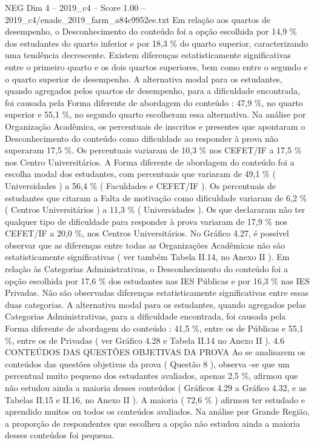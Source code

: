 \begin{textsample}{NEG Dim 4 – 2019\_c4 – Score 1.00 – 2019\_c4/enade\_2019\_farm\_a84c9952ee.txt}
Em relação aos quartos de desempenho, o Desconhecimento do conteúdo foi a opção escolhida por 14,9 \% dos estudantes do quarto inferior e por 18,3 \% do quarto superior, caracterizando uma tendência decrescente.
Existem diferenças estatisticamente significativas entre o primeiro quarto e os dois quartos superiores, bem como entre o segundo e o quarto superior de desempenho.
A alternativa modal para os estudantes, quando agregados pelos quartos de desempenho, para a dificuldade encontrada, foi causada pela Forma diferente de abordagem do conteúdo : 47,9 \%, no quarto superior e 55,1 \%, no segundo quarto escolheram essa alternativa.
Na análise por Organização Acadêmica, os percentuais de inscritos e presentes que apontaram o Desconhecimento do conteúdo como dificuldade ao responder à prova não superaram 17,5 \%.
Os percentuais variaram de 10,3 \% nos CEFET/IF a 17,5 \% nos Centro Universitários.
A Forma diferente de abordagem do conteúdo foi a escolha modal dos estudantes, com percentuais que variaram de 49,1 \% ( Universidades ) a 56,4 \% ( Faculdades e CEFET/IF ).
Os percentuais de estudantes que citaram a Falta de motivação como dificuldade variaram de 6,2 \% ( Centros Universitários ) a 11,3 \% ( Universidades ).
Os que declararam não ter qualquer tipo de dificuldade para responder à prova variaram de 17,9 \% nos CEFET/IF a 20,0 \%, nos Centros Universitários.
No Gráfico 4.27, é possível observar que as diferenças entre todas as Organizações Acadêmicas não são estatisticamente significativas ( ver também Tabela II.14, no Anexo II ).
Em relação às Categorias Administrativas, o Desconhecimento do conteúdo foi a opção escolhida por 17,6 \% dos estudantes nas IES Públicas e por 16,3 \% nas IES Privadas.
Não são observadas diferenças estatisticamente significativas entre essas duas categorias.
A alternativa modal para os estudantes, quando agregados pelas Categorias Administrativas, para a dificuldade encontrada, foi causada pela Forma diferente de abordagem do conteúdo : 41,5 \%, entre os de Públicas e 55,1 \%, entre os de Privadas ( ver Gráfico 4.28 e Tabela II.14 no Anexo II ). 4.6 CONTEÚDOS DAS QUESTÕES OBJETIVAS DA PROVA Ao se analisarem os conteúdos das questões objetivas da prova ( Questão 8 ), observa -se que um percentual muito pequeno dos estudantes avaliados, apenas 2,5 \%, afirmou que não estudou ainda a maioria desses conteúdos ( Gráficos 4.29 a Gráfico 4.32, e as Tabelas II.15 e II.16, no Anexo II ).
A maioria ( 72,6 \% ) afirmou ter estudado e aprendido muitos ou todos os conteúdos avaliados.
Na análise por Grande Região, a proporção de respondentes que escolheu a opção não estudou ainda a maioria desses conteúdos foi pequena.

\end{textsample}
